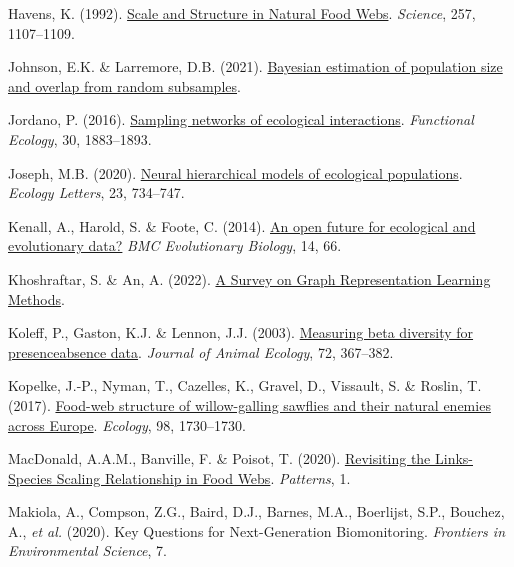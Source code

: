 \documentclass[11pt]{article}
\newlength{\cslhangindent}
\newenvironment{CSLReferences}[3] %
 {%
  \setlength{\parindent}{0pt}
  \ifodd #1 \everypar{\setlength{\hangindent}{\cslhangindent}}\ignorespaces\fi
  \ifnum #2 > 0
  \setlength{\parskip}{#2\baselineskip}
  \fi
 }%
 {}
\begin{document}
\begin{CSLReferences}{1}{0}
\leavevmode{}%
Havens, K. (1992).
\href{https://doi.org/10.1126/science.257.5073.1107}{Scale and Structure
in Natural Food Webs}. \emph{Science}, 257, 1107--1109.

\leavevmode{}%
Johnson, E.K. \& Larremore, D.B. (2021).
\href{https://doi.org/10.1101/2021.07.06.451319}{Bayesian estimation of
population size and overlap from random subsamples}.

\leavevmode{}%
Jordano, P. (2016).
\href{https://doi.org/10.1111/1365-2435.12763}{Sampling networks of
ecological interactions}. \emph{Functional Ecology}, 30, 1883--1893.

\leavevmode{}%
Joseph, M.B. (2020). \href{https://doi.org/10.1111/ele.13462}{Neural
hierarchical models of ecological populations}. \emph{Ecology Letters},
23, 734--747.

\leavevmode{}%
Kenall, A., Harold, S. \& Foote, C. (2014).
\href{https://doi.org/10.1186/1471-2148-14-66}{An open future for
ecological and evolutionary data?} \emph{BMC Evolutionary Biology}, 14,
66.

\leavevmode{}%
Khoshraftar, S. \& An, A. (2022).
\href{https://doi.org/10.48550/arXiv.2204.01855}{A Survey on Graph
Representation Learning Methods}.

\leavevmode{}%
Koleff, P., Gaston, K.J. \& Lennon, J.J. (2003).
\href{https://doi.org/10.1046/j.1365-2656.2003.00710.x}{Measuring beta
diversity for presenceabsence data}. \emph{Journal of Animal Ecology},
72, 367--382.

\leavevmode{}%
Kopelke, J.-P., Nyman, T., Cazelles, K., Gravel, D., Vissault, S. \&
Roslin, T. (2017). \href{https://doi.org/10.1002/ecy.1832}{Food-web
structure of willow-galling sawflies and their natural enemies across
Europe}. \emph{Ecology}, 98, 1730--1730.

\leavevmode{}%
MacDonald, A.A.M., Banville, F. \& Poisot, T. (2020).
\href{https://doi.org/10.1016/j.patter.2020.100079}{Revisiting the
Links-Species Scaling Relationship in Food Webs}. \emph{Patterns}, 1.

\leavevmode{}%
Makiola, A., Compson, Z.G., Baird, D.J., Barnes, M.A., Boerlijst, S.P.,
Bouchez, A., \emph{et al.} (2020). Key Questions for Next-Generation
Biomonitoring. \emph{Frontiers in Environmental Science}, 7.


\end{CSLReferences}
\end{document}
